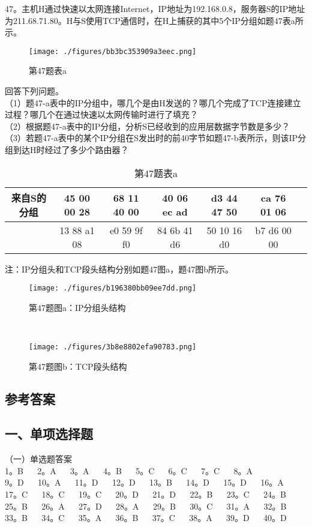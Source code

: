 47。主机H通过快速以太网连接Internet，IP地址为192.168.0.8，服务器S的IP地址为211.68.71.80。H与S使用TCP通信时，在H上捕获的其中5个IP分组如题47表a所示。
\begin{figure}[ht]
\centering
\texttt{[image: ./figures/bb3bc353909a3eec.png]}
\caption{第47题表a} \label{fig_CSN12_6}
\end{figure}
回答下列问题。\\
（1）题47-a表中的IP分组中，哪几个是由H发送的？哪几个完成了TCP连接建立过程？哪几个在通过快速以太网传输时进行了填充？\\
（2）根据题47-a表中的IP分组，分析S已经收到的应用层数据字节数是多少？\\
（3）若题47-a表中的某个IP分组在S发出时的前40字节如题47-b表所示，则该IP分组到达H时经过了多少个路由器？\\
\begin{table}[ht]
\centering
\caption{第47题表a}\label{tab_CSN12_3}
\begin{tabular}{|c|c|c|c|c|c|c|}
\hline
来自S的分组 & 45 00 00 28 & 68 11 40 00 & 40 06 ec ad & d3 44 47 50 & ca 76 01 06 &  \\
\hline
 & 13 88 a1 08 & e0 59 9f f0 & 84 6b 41 d6 & 50 10 16 d0 & b7 d6 00 00 &  \\
\hline
\end{tabular}
\end{table}
注：IP分组头和TCP段头结构分别如题47图a，题47图b所示。\\
\begin{figure}[ht]
\centering
\texttt{[image: ./figures/b196380bb09ee7dd.png]}
\caption{第47题图a：IP分组头结构} \label{fig_CSN12_7}
\end{figure}\\
\begin{figure}[ht]
\centering
\texttt{[image: ./figures/3b8e8802efa90783.png]}
\caption{第47题图b：TCP段头结构} \label{fig_CSN12_8}
\end{figure}

\subsection{参考答案}
\subsection{一、单项选择题}
（一）单选题答案 \\
1。B $\quad$ 2。A $\quad$ 3。A $\quad$ 4。B $\quad$ 5。C $\quad$ 6。C $\quad$ 7。C $\quad$ 8。A \\
9。D $\quad$ 10。A $\quad$ 11。D $\quad$ 12。D $\quad$ 13。B $\quad$ 14。D $\quad$ 15。D $\quad$ 16。A $\quad$ \\
17。C $\quad$ 18。C $\quad$ 19。C $\quad$ 20。D $\quad$ 21。D $\quad$ 22。B $\quad$ 23。C $\quad$ 24。B \\
25。B $\quad$ 26。A $\quad$ 27。D $\quad$ 28。A $\quad$ 29。B  $\quad$ 30。C $\quad$ 31。A $\quad$ 32。B \\
33。B $\quad$ 34。C $\quad$ 35。A $\quad$ 36。B $\quad$ 37。C $\quad$ 38。A $\quad$ 39。D $\quad$ 40。D

